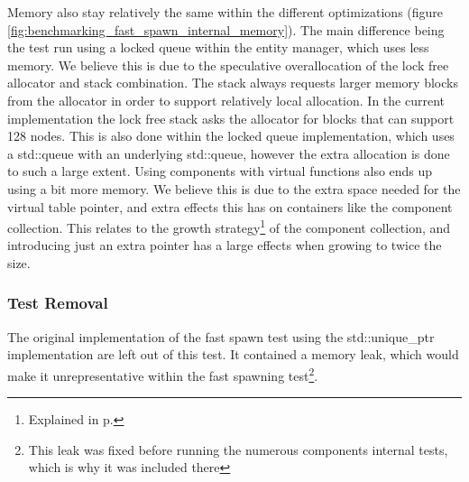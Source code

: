 Memory also stay relatively the same within the different optimizations (figure \ref{fig:benchmarking_fast_spawn_internal_memory}).
The main difference being the test run using a locked queue within the entity manager, which uses less memory.
We believe this is due to the speculative overallocation of the lock free allocator and stack combination.
The stack always requests larger memory blocks from the allocator in order to support relatively local allocation.
In the current implementation the lock free stack asks the allocator for blocks that can support 128 nodes.
This is also done within the locked queue implementation, which uses a std::queue with an underlying std::queue,
however the extra allocation is done to such a large extent.
Using components with virtual functions also ends up using a bit more memory.
We believe this is due to the extra space needed for the virtual table pointer,
and extra effects this has on containers like the component collection.
This relates to the growth strategy\footnote{Explained in p.\pageref{par:detailed_component_collection_reallocation_growth}} of the component collection,
and introducing just an extra pointer has a large effects when growing to twice the size.

\subsubsection{Test Removal}
The original implementation of the fast spawn test using the std::unique\_ptr implementation are left out of this test.
It contained a memory leak, which would make it unrepresentative within the fast spawning test\footnote{This leak was fixed before running the numerous components internal tests, which is why it was included there}.
